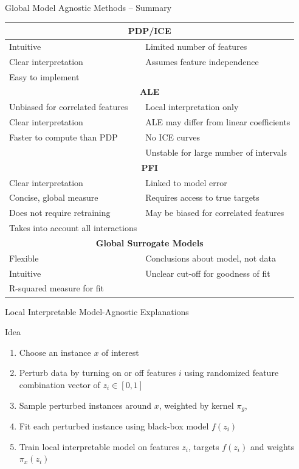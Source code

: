 \documentclass[ignorenonframetext,xcolor=x11names]{beamer}
\begin{document}
\begin{frame}{Global Model Agnostic Methods -- Summary}
\footnotesize
\renewcommand{\arraystretch}{1.1}
\begin{tabular}{l|l} \hline
\multicolumn{2}{c}{\textbf{PDP/ICE}} \\ \hline
Intuitive & Limited number of features \\
Clear interpretation & Assumes feature independence \\
Easy to implement & \\ \hline
\multicolumn{2}{c}{\textbf{ALE}} \\ \hline
Unbiased for correlated features & Local interpretation only\\
Clear interpretation & ALE may differ from linear coefficients\\ 
Faster to compute than PDP & No ICE curves \\
& Unstable for large number of intervals \\  \hline
\multicolumn{2}{c}{\textbf{PFI}} \\ \hline
Clear interpretation & Linked to model error \\
Concise, global measure & Requires access to true targets \\
Does not require retraining & May be biased for correlated features \\
Takes into account all interactions & \\ \hline
\multicolumn{2}{c}{\textbf{Global Surrogate Models}} \\ \hline
Flexible & Conclusions about model, not data \\ 
Intuitive & Unclear cut-off for goodness of fit \\
R-squared measure for fit & \\ \hline
\end{tabular}
\end{frame}

\begin{frame}{Local Interpretable Model-Agnostic Explanations}
\small
\begin{block}{Idea}
\begin{enumerate}
   \item Choose an instance $x$ of interest
   \item Perturb data by turning on or off features $i$ using randomized feature combination vector of $z_i \in [0, 1]$
   \item Sample perturbed instances around $x$, weighted by kernel $\pi_g$,
   \item Fit each perturbed instance using black-box model $f(z_i)$
   \item Train local interpretable model on features $z_i$, targets $f(z_i)$ and weights $\pi_x(z_i)$
\end{enumerate}
\end{block}

\end{frame}
\end{document}
